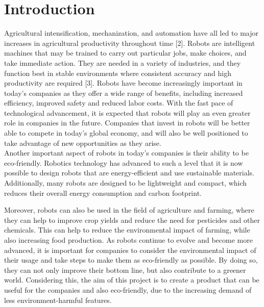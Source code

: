 

\section{Introduction}\label{sec:introduction}
Agricultural intensification, mechanization, and automation have all led to major increases in agricultural productivity throughout time [2]. Robots are intelligent machines that may be trained to carry out particular jobs, make choices, and take immediate action. They are needed in a variety of industries, and they function best in stable environments where consistent accuracy and high productivity are required [3]. Robots have become increasingly important in today's companies as they offer a wide range of benefits, including increased efficiency, improved safety and reduced labor costs. With the fast pace of technological advancement, it is expected that robots will play an even greater role in companies in the future. Companies that invest in robots will be better able to compete in today's global economy, and will also be well positioned to take advantage of new opportunities as they arise.~\\

\noindent Another important aspect of robots in today's companies is their ability to be eco-friendly. Robotics technology has advanced to such a level that it is now possible to design robots that are energy-efficient and use sustainable materials. Additionally, many robots are designed to be lightweight and compact, which reduces their overall energy consumption and carbon footprint.

\noindent Moreover, robots can also be used in the field of agriculture and farming, where they can help to improve crop yields and reduce the need for pesticides and other chemicals. This can help to reduce the environmental impact of farming, while also increasing food production. As robots continue to evolve and become more advanced, it is important for companies to consider the environmental impact of their usage and take steps to make them as eco-friendly as possible. By doing so, they can not only improve their bottom line, but also contribute to a greener world.
Considering this, the aim of this project is to create a product that can be useful for the companies and also eco-friendly, due to the increasing demand of less environment-harmful features.\\

